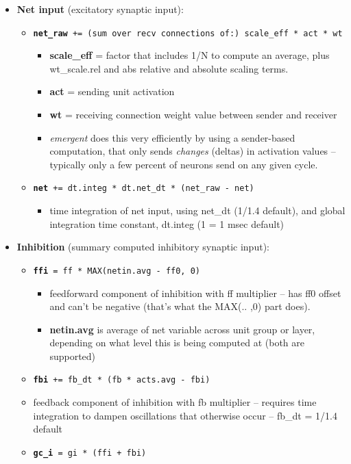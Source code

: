 \begin{itemize}
\item {\bf Net input} (excitatory synaptic input):
  \begin{itemize}
  \item {\tt  {\bf net\_raw} +=  (sum over recv connections of:) scale\_eff * act * wt}
    \begin{itemize}
    \item {\bf scale\_eff} = factor that includes 1/N to compute an average, plus wt\_scale.rel and abs relative and absolute scaling terms.
    \item {\bf act} = sending unit activation
    \item {\bf wt} = receiving connection weight value between sender and receiver
    \item {\em emergent} does this very efficiently by using a sender-based computation, that only sends {\em changes} (deltas) in activation values -- typically only a few percent of neurons send on any given cycle.
    \end{itemize}
  \item {\tt {\bf net} += dt.integ * dt.net\_dt * (net\_raw - net)}
    \begin{itemize}
    \item time integration of net input, using net\_dt (1/1.4 default), and global integration time constant, dt.integ (1 = 1 msec default)
    \end{itemize}
  \end{itemize}

\item {\bf Inhibition} (summary computed inhibitory synaptic input):
  \begin{itemize}
  \item {\tt {\bf ffi} = ff * MAX(netin.avg - ff0, 0)}
    \begin{itemize}
    \item feedforward component of inhibition with ff multiplier -- has ff0 offset and can't be negative (that's what the MAX(.. ,0) part does).
    \item {\bf netin.avg} is average of net variable across unit group or layer, depending on what level this is being computed at (both are supported)
    \end{itemize}
  \item {\tt {\bf fbi} += fb\_dt * (fb * acts.avg - fbi)}
  \item feedback component of inhibition with fb multiplier -- requires time integration to dampen oscillations that otherwise occur -- fb\_dt = 1/1.4 default
  \item {\tt {\bf gc\_i} = gi * (ffi + fbi)}
  \end{itemize}


\end{itemize}
